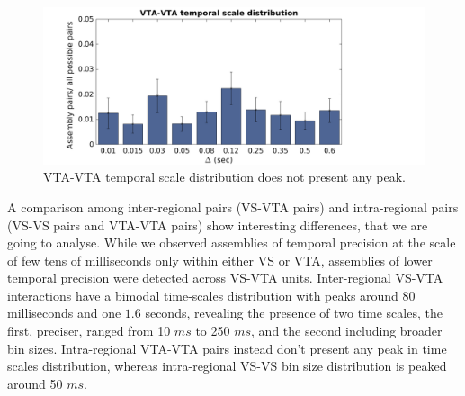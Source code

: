 \begin{figure}[H]
\includegraphics[scale=0.45]{figures/VTA_VTA_S.png}
\caption{VTA-VTA temporal scale distribution does not present any peak.}
\label{fig:BinDistrVTA}
\end{figure}
A comparison among inter-regional pairs (VS-VTA pairs) and intra-regional pairs (VS-VS pairs and VTA-VTA pairs) show interesting differences, that we are going to analyse.
While we observed assemblies of temporal precision at the scale of few tens of milliseconds only within either VS or VTA, assemblies of lower temporal precision were detected across VS-VTA units. Inter-regional VS-VTA interactions have a bimodal time-scales distribution with peaks around $80$ milliseconds and one $1.6$ seconds, revealing the presence of two time scales, the first, preciser, ranged from 10 $ms$ to 250 $ms$, and the second including broader bin sizes. Intra-regional VTA-VTA pairs instead don't present any peak in time scales distribution, whereas intra-regional VS-VS bin size distribution is peaked around 50 $ms$. 
